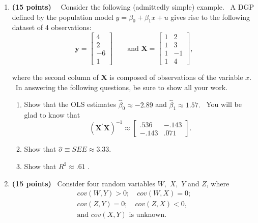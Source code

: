 \documentclass[11pt]{article}
\begin{document}
\begin{enumerate}
\item \textbf{(15 points)} \ \ Consider the following (admittedly simple)
example. \ A DGP defined by the population model $y=\beta _{0}+\beta _{1}x+u$
gives rise to the following dataset of 4 observations:%
\begin{equation*}
\mathbf{y}=%
\begin{bmatrix}
4 \\ 
2 \\ 
-6 \\ 
1%
\end{bmatrix}%
\qquad \text{and \ \ \ \ }\mathbf{X}=%
\begin{bmatrix}
1 & 2 \\ 
1 & 3 \\ 
1 & -1 \\ 
1 & 4%
\end{bmatrix}%
,
\end{equation*}

where the second column of $\mathbf{X}$ is composed of observations of the
variable $x$. \ In answering the following questions, be sure to show all
your work. \ \bigskip

\begin{enumerate}
\item Show that the OLS estimates $\widehat{\beta }_{0}\approx -2.89$ and $%
\widehat{\beta }_{1}\approx 1.57.$ \ You will be glad to know that 
\begin{equation*}
\left( \mathbf{X}^{\prime }\mathbf{X}\right) ^{-1}\approx 
\begin{bmatrix}
.536 & -.143 \\ 
-.143 & .071%
\end{bmatrix}%
.
\end{equation*}

\item Show that $\widehat{\sigma }\equiv SEE\approx 3.33$.\bigskip

\item Show that $R^{2}\approx .61$ .\newpage
\end{enumerate}

\item \textbf{(15 points)} \ Consider four random variables $W,$ $X,$ $Y$
and $Z$, where%
\begin{gather*}
cov(W,Y)>0;\quad cov(W,X)=0; \\
cov(Z,Y)=0;\quad cov(Z,X)<0\text{, } \\
\text{and }cov(X,Y)\text{ is unknown.}
\end{gather*}%
\smallskip


\end{enumerate}
\end{document}

